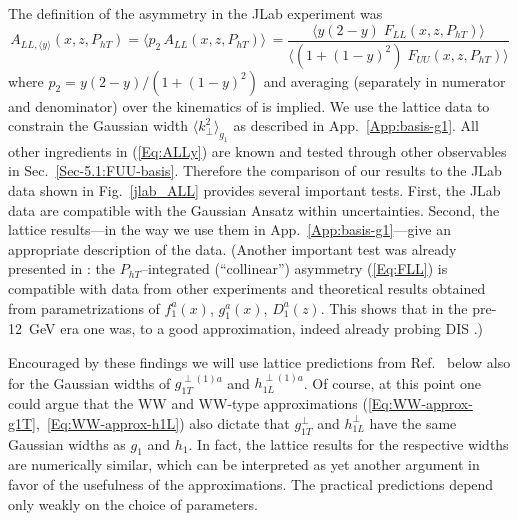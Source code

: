 \documentclass[a4paper,11pt]{article}
\newcommand{\be}{\begin{equation}}
\newcommand{\ee}{\end{equation}}
\newcommand{\la}{\langle}
\newcommand{\ra}{\rangle}
\def\Phperp{P_{hT}}
\def\kperp{k_\perp}
\begin{document}
The definition of the asymmetry in  the JLab experiment \cite{Avakian:2010ae}
was
\be\label{Eq:ALLy}
	A_{LL,\la y\ra}(x,z,\Phperp)
	= \la p_2 \,A_{LL}(x,z,\Phperp) \ra \,
	= \frac{\la y (2-y) \; F_{LL}(x,z,\Phperp)\ra}
	{\la(1+(1-y)^2) \; F_{UU}(x,z,\Phperp)\ra}
\ee
where $p_2 = y (2-y)/(1+(1-y)^2)$ and averaging (separately in numerator
and denominator) over the kinematics of \cite{Avakian:2010ae} is implied.
We use the lattice data \cite{Hagler:2009mb} to
constrain the Gaussian width $\la\kperp^2\ra_{g_1}$ as described in
App.~\ref{App:basis-g1}. All other ingredients in (\ref{Eq:ALLy}) are known
and tested through other observables in Sec.~\ref{Sec-5.1:FUU-basis}.
Therefore the comparison of our results to the JLab data \cite{Avakian:2010ae}
shown in Fig.~\ref{jlab_ALL} provides several important tests.
First, the JLab data \cite{Avakian:2010ae} are compatible
with the Gaussian Ansatz within uncertainties. Second, the lattice
results---in the way we use them in App.~\ref{App:basis-g1}---give an appropriate
description of the data.
	(Another important test was already presented in
	\cite{Avakian:2010ae}: the $\Phperp$--integrated (``collinear'')
	asymmetry (\ref{Eq:FLL}) is compatible with data
	from other experiments and theoretical results obtained from
	parametrizations of $f_1^a(x)$, $g_1^a(x)$, $D_1^a(z)$. This
	shows that in the pre-12~GeV era one was, to a good
	approximation, indeed already probing DIS \cite{Avakian:2010ae}.)

Encouraged by these findings we will use lattice predictions from
Ref.~\cite{Hagler:2009mb} below also for the Gaussian widths of
$g_{1T}^{\perp(1)a}$ and $h_{1L}^{\perp(1)a}$.
Of course, at this point one could argue that the WW and WW-type
approximations (\ref{Eq:WW-approx-g1T},~\ref{Eq:WW-approx-h1L}) also
dictate that $g_{1T}^\perp$ and $h_{1L}^\perp$ have the same Gaussian
widths as $g_1$ and $h_1$. In fact, the lattice results for the
respective widths are numerically similar, which can be interpreted as
yet another argument in favor of the usefulness of the approximations.
The practical predictions depend only weakly on the choice of parameters.
\end{document}
